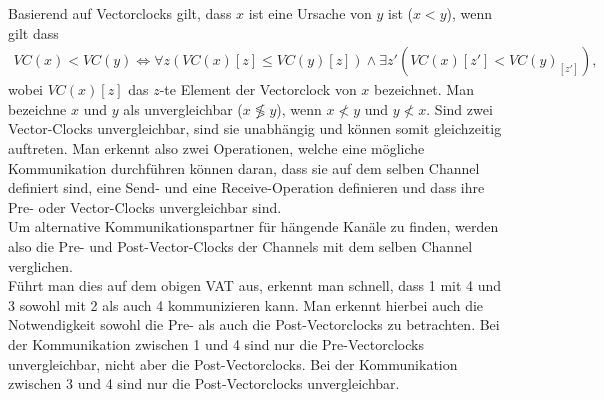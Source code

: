 Basierend auf Vectorclocks gilt, dass $x$ ist eine Ursache von $y$ ist ($x < y$), wenn gilt dass 
\begin{align}
  VC(x) < VC(y) \Leftrightarrow \forall z (VC(x)[z] \leq VC(y)[z]) \land \exists z' (VC(x)[{z'}] < VC(y)_[{z'}]),
\end{align}
wobei $VC(x)[z]$ das $z$-te Element der Vectorclock von $x$ bezeichnet.
Man bezeichne $x$ und $y$ als unvergleichbar ($x \not\lessgtr y$), wenn 
$x \not< y $ und $y \not< x$.
Sind zwei Vector-Clocks 
unvergleichbar, sind sie unabhängig und können somit gleichzeitig auftreten. 
Man erkennt also zwei Operationen, welche eine mögliche Kommunikation durchführen 
können daran, dass sie auf dem selben Channel definiert sind, eine Send-
und eine Receive-Operation definieren und dass 
 ihre Pre- oder Vector-Clocks unvergleichbar sind.\\
Um alternative Kommunikationspartner für hängende Kanäle zu finden, werden also
die Pre- und Post-Vector-Clocks der Channels mit dem selben Channel verglichen.\\
Führt man dies auf dem obigen VAT aus, erkennt man schnell, dass 1 mit 4 und 3 
sowohl mit 2 als auch 4 kommunizieren kann. Man erkennt hierbei auch die 
Notwendigkeit sowohl die Pre- als auch die Post-Vectorclocks zu betrachten.
Bei der Kommunikation zwischen 1 und 4 sind nur die Pre-Vectorclocks 
unvergleichbar, nicht aber die Post-Vectorclocks. Bei der Kommunikation zwischen 
3 und 4 sind nur die Post-Vectorclocks unvergleichbar. 


